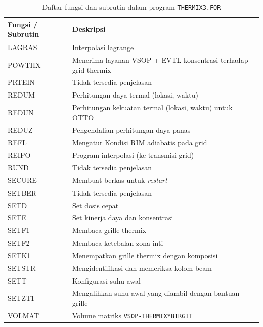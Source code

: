 \documentclass[a4paper,11pt]{report}
\begin{document}
\begin{table}[h!]
  \caption{Daftar fungsi dan subrutin dalam program \texttt{THERMIX3.FOR}}
  \label{tab:the3}
  \begin{center}
    \begin{tabular}{p{3cm}|p{10cm}} \toprule
    Fungsi / Subrutin & Deskripsi\\ \midrule
      LAGRAS & Interpolasi lagrange \\
      POWTHX & Menerima layanan VSOP + EVTL konsentrasi terhadap grid thermix \\
      PRTEIN & Tidak tersedia penjelasan \\
      REDUM & Perhitungan daya termal (lokasi, waktu) \\
      REDUN & Perhitungan kekuatan termal (lokasi, waktu) untuk OTTO \\
      REDUZ & Pengendalian perhitungan daya panas \\
      REFL & Mengatur Kondisi RIM adiabatis pada grid \\
      REIPO & Program interpolasi (ke transmisi grid) \\
      RUND & Tidak tersedia penjelasan \\
      SECURE & Membuat berkas untuk \textit{restart}\\
      SETBER & Tidak tersedia penjelasan \\
      SETD & Set dosis cepat \\
      SETE & Set kinerja daya dan konsentrasi \\
      SETF1 & Membaca grille thermix \\
      SETF2 & Membaca ketebalan zona inti \\
      SETK1 & Menempatkan grille thermix dengan komposisi \\
      SETSTR & Mengidentifikasi dan memeriksa kolom beam \\
      SETT & Konfigurasi suhu awal \\
      SETZT1 & Mengalihkan suhu awal yang diambil dengan bantuan grille\\
      VOLMAT & Volume matriks \texttt{VSOP-THERMIX*BIRGIT} \\
      \bottomrule
    \end{tabular}
  \end{center}
\end{table}
\end{document}
